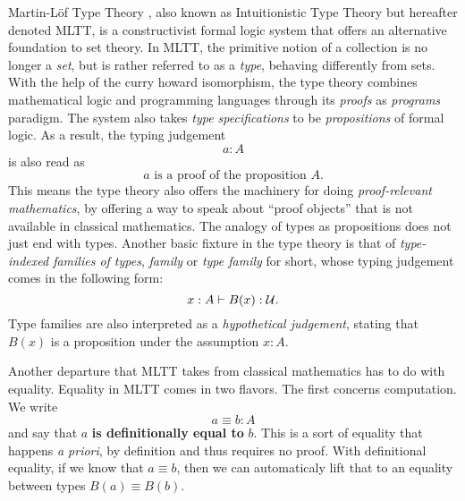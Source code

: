 \documentclass[main.tex]{subfiles}
\begin{document}
Martin-L\"of Type Theory \cite{martin1984intuitionistic}, also known as Intuitionistic Type Theory but hereafter denoted MLTT, is a constructivist formal logic system that offers an alternative foundation to set theory. In MLTT, the primitive notion of a collection is no longer a \textit{set}, but is rather referred to as a \textit{type}, behaving differently from sets. With the help of the curry howard isomorphism, the type theory combines mathematical logic and programming languages through its \textit{proofs} as \textit{programs} paradigm. The system also takes \textit{type specifications} to be \textit{propositions} of formal logic. As a result, the typing judgement 
\[ a : A \]
is also read as
\[
a \text{ is a proof of the proposition } A.
\]
This means the type theory also offers the machinery for doing \textit{proof-relevant mathematics}, by offering a way to speak about ``proof objects'' that is not available in classical mathematics. The analogy of types as propositions does not just end with types. Another basic fixture in the type theory is that of \textit{type-indexed families of types}, \textit{family} or \textit{type family} for short, whose typing judgement comes in the following form:
\[
x : A \vdash B (x) : \mathcal{U}.
\]
Type families are also interpreted as a \textit{hypothetical judgement}, stating that $B(x)$ is a proposition under the assumption $x:A$. 

Another departure that MLTT takes from classical mathematics has to do with equality. Equality in MLTT comes in two flavors. The first concerns computation. We write \[ a \equiv b : A\] and say that $a$ \textbf{is definitionally equal to} $b$. This is a sort of equality that happens \textit{a priori}, by definition and thus requires no proof. With definitional equality, if we know that $a \equiv b$, then we can automaticaly lift that to an equality between types $B(a) \equiv B(b)$. 
\end{document}
